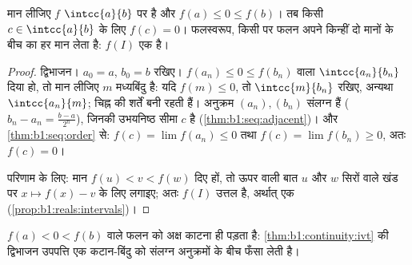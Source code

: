 \begin{theorem}[मध्यवर्ती मान प्रमेय]\label{thm:b1:continuity:ivt}
मान लीजिए $f$ $\intcc{a}{b}$ पर  है और $f(a) \leq 0 \leq f(b)$। तब किसी
$c \in \intcc{a}{b}$ के लिए $f(c) = 0$। फलस्वरूप, किसी  पर  फलन
अपने किन्हीं दो मानों के बीच का हर मान लेता है: $f(I)$ एक 
है।
\end{theorem}

\begin{proof}
द्विभाजन। $a_0 = a$, $b_0 = b$ रखिए। $f(a_n) \leq 0 \leq f(b_n)$ वाला
$\intcc{a_n}{b_n}$ दिया हो, तो मान लीजिए $m$ मध्यबिंदु है: यदि $f(m) \leq
0$, तो $\intcc{m}{b_n}$ रखिए, अन्यथा $\intcc{a_n}{m}$; चिह्न की शर्तें बनी
रहती हैं। अनुक्रम $(a_n), (b_n)$ संलग्न हैं ($b_n - a_n = \frac{b-a}{2^n}$),
जिनकी उभयनिष्ठ सीमा $c$ है (\cref{thm:b1:seq:adjacent})।  और
\cref{thm:b1:seq:order} से: $f(c) = \lim f(a_n) \leq 0$ तथा $f(c) = \lim
f(b_n) \geq 0$, अतः $f(c) = 0$।

परिणाम के लिए: मान $f(u) < v < f(w)$ दिए हों, तो ऊपर वाली बात $u$ और $w$
सिरों वाले खंड पर $x \mapsto f(x) - v$ के लिए लगाइए; अतः $f(I)$ उत्तल है,
अर्थात् एक  (\cref{prop:b1:reals:intervals})।
\end{proof}

\begin{omfigure}

{\small $f(a) < 0 < f(b)$ वाले  फलन को अक्ष काटना ही पड़ता है:
\cref{thm:b1:continuity:ivt} की द्विभाजन उपपत्ति एक कटान-बिंदु को संलग्न
अनुक्रमों के बीच फँसा लेती है।}
\end{omfigure}

